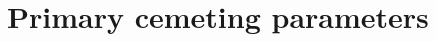 \documentclass[review]{elsarticle}
\newcommand{\fracp}[2]{\frac{\partial #1}{\partial #2}} %
\begin{document}

\section{Primary cemeting parameters}
\end{document}
